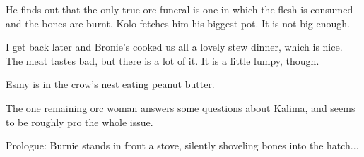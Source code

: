 He finds out that the only true orc funeral is one in which the flesh is consumed and the bones are burnt. Kolo fetches him his biggest pot. It is not big enough.\medskip

I get back later and Bronie's cooked us all a lovely stew dinner, which is nice. The meat tastes bad, but there is a lot of it. It is a little lumpy, though.\medskip

Esmy is in the crow's nest eating peanut butter.\medskip

The one remaining orc woman answers some questions about Kalima, and seems to be roughly pro the whole issue.\medskip

Prologue: Burnie stands in front a stove, silently shoveling bones into the hatch...

\vspace*{5mm}
